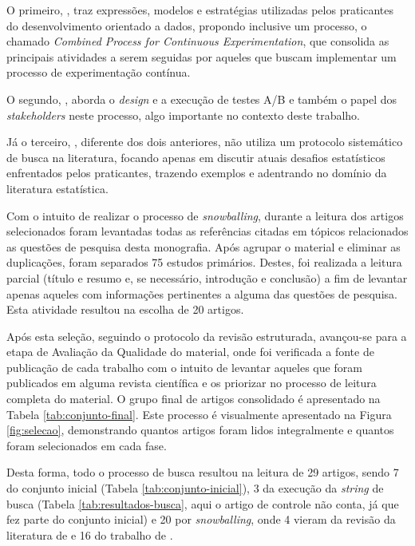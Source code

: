 O primeiro, , traz expressões, modelos e estratégias utilizadas pelos praticantes do desenvolvimento orientado a dados, propondo inclusive um processo, o chamado \textit{Combined Process for Continuous Experimentation}, que consolida as principais atividades a serem seguidas por aqueles que buscam implementar um processo de experimentação contínua.

O segundo, , aborda o  \textit{design} e a execução de testes A/B e também o papel dos \textit{stakeholders} neste processo, algo importante no contexto deste trabalho. 

Já o terceiro, , diferente dos dois anteriores, não utiliza um protocolo sistemático de busca na literatura, focando apenas em discutir atuais desafios estatísticos enfrentados pelos praticantes, trazendo exemplos e adentrando no domínio da literatura estatística.

Com o intuito de realizar o processo de \textit{snowballing}, durante a leitura dos artigos selecionados foram levantadas todas as referências citadas em tópicos relacionados as questões de pesquisa desta monografia. Após agrupar o material e eliminar as duplicações, foram separados 75 estudos primários. Destes, foi realizada a leitura parcial (título e resumo e, se necessário, introdução e conclusão) a fim de levantar apenas aqueles com informações pertinentes a alguma das questões de pesquisa. Esta atividade resultou na escolha de 20 artigos.

Após esta seleção, seguindo o protocolo da revisão estruturada, avançou-se para a etapa de Avaliação da Qualidade do material, onde foi verificada a fonte de publicação de cada trabalho com o intuito de levantar aqueles que foram publicados em alguma revista científica e os priorizar no processo de leitura completa do material. O grupo final de artigos consolidado é apresentado na Tabela \ref{tab:conjunto-final}. Este processo é visualmente apresentado na Figura \ref{fig:selecao}, demonstrando quantos artigos foram lidos integralmente e quantos foram selecionados em cada fase.

Desta forma, todo o processo de busca resultou na leitura de 29 artigos, sendo 7 do conjunto inicial (Tabela \ref{tab:conjunto-inicial}), 3 da execução da \textit{string} de busca (Tabela \ref{tab:resultados-busca}, aqui o artigo de controle não conta, já que fez parte do conjunto inicial) e 20 por \textit{snowballing}, onde 4 vieram da revisão da literatura de  \cite{yu_new_2020} \cite{chen_automatic_2018} \cite{fabijan_benefits_2017} \cite{le_goues_towards_2014} e 16 do trabalho de  \cite{kuhrmann_activity_2018} \cite{bures_infrastructure_2021} \cite{kevic_characterizing_2017} \cite{liu_enterprise-level_2019} \cite{olsson_opinions_2014} \cite{fernandes_hitting_2015} \cite{melegati_hypotheses_2019} \cite{kohavi_online_2013} \cite{crook_seven_2009} \cite{issa_mattos_hurrier_2023} \cite{fabijan_online_2020} \cite{fagerholm_right_2017} \cite{fabijan_three_2019} \cite{olsson_towards_2015} \cite{sauvola_towards_2015} \cite{melegati_understanding_2021}
.

